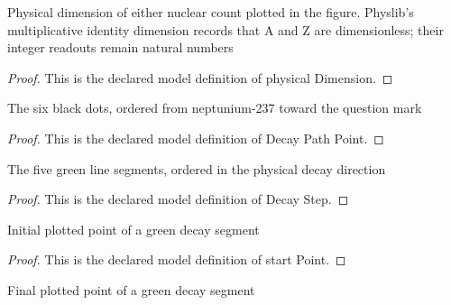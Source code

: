 \begin{definition}
  \label{def:physics:phyx-mini-0574:phyxminiproblems-problemphyxmini0574-nuclearplotquantity-physicaldimension}
  Physical dimension of either nuclear count plotted in the figure. Physlib's multiplicative identity dimension records that A and Z are dimensionless; their integer readouts remain natural numbers
\end{definition}
\begin{proof}
  This is the declared model definition of physical Dimension.
\end{proof}
\begin{definition}
  \label{def:physics:phyx-mini-0574:phyxminiproblems-problemphyxmini0574-decaypathpoint}
  The six black dots, ordered from neptunium-237 toward the question mark
\end{definition}
\begin{proof}
  This is the declared model definition of Decay Path Point.
\end{proof}
\begin{definition}
  \label{def:physics:phyx-mini-0574:phyxminiproblems-problemphyxmini0574-decaystep}
  The five green line segments, ordered in the physical decay direction
\end{definition}
\begin{proof}
  This is the declared model definition of Decay Step.
\end{proof}
\begin{definition}
  \label{def:physics:phyx-mini-0574:phyxminiproblems-problemphyxmini0574-decaystep-startpoint}
  Initial plotted point of a green decay segment
\end{definition}
\begin{proof}
  This is the declared model definition of start Point.
\end{proof}
\begin{definition}
  \label{def:physics:phyx-mini-0574:phyxminiproblems-problemphyxmini0574-decaystep-endpoint}
  Final plotted point of a green decay segment
\end{definition}
